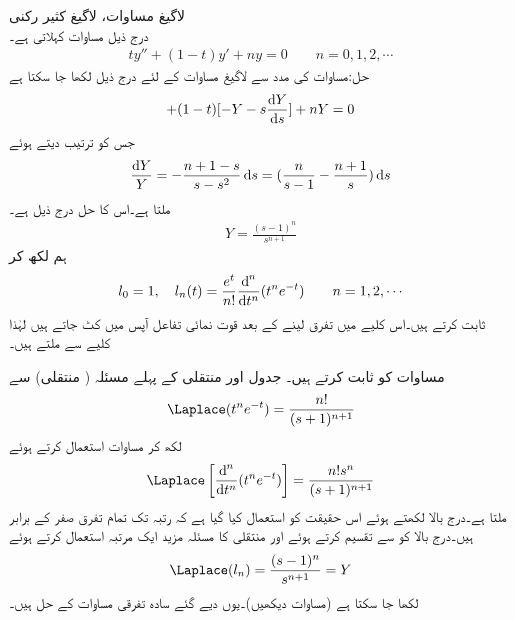 \quad لاگیغ مساوات، لاگیغ کثیر رکنی\\
درج ذیل  مساوات کہلاتی ہے۔ 
\begin{align}\label{مساوات_لاپلاس_لاگیغ_کی_مساوات}
ty''+(1-t)y'+ny=0\quad \quad n=0,1,2,\cdots
\end{align}
حل:مساوات  کی مدد سے لاگیغ مساوات کے لئے درج ذیل لکھا جا سکتا ہے
\begin{align*}
[-2sY-s^2\frac{\dif Y}{\dif s}+y(0)]+(1-t)[-Y-s\frac{\dif Y}{\dif s}]+nY=0
\end{align*}
جس کو ترتیب دیتے ہوئے
\begin{align*}
\frac{\dif Y}{Y}=-\frac{n+1-s}{s-s^2}\dif s=(\frac{n}{s-1}-\frac{n+1}{s})\dif s
\end{align*}
ملتا ہے۔اس کا حل درج ذیل ہے۔
\begin{align}
Y=\frac{(s-1)^n}{s^{n+1}}
\end{align}
ہم  لکھ کر 
\begin{align}\label{مساوات_لاپلاس_روڈریکیس_کثیر_رکنی}
l_0=1,\quad l_n(t)=\frac{e^t}{n!}\frac{\dif^{\,n}}{\dif t^n}(t^ne^{-t})\quad \quad n=1,2,\cdots
\end{align}
ثابت کرتے ہیں۔اس کلیے میں تفرق لینے کے بعد قوت نمائی تفاعل آپس میں کٹ جاتے ہیں لہٰذا کلیے سے  ملتے ہیں۔ 

مساوات  کو ثابت کرتے ہیں۔ جدول  اور منتقلی کے پہلے مسئلہ ( منتقلی) سے
\begin{align}
\Laplace(t^ne^{-t})=\frac{n!}{(s+1)^{n+1}}
\end{align}
لکھ کر مساوات  استعمال کرتے ہوئے
\begin{align*}
\Laplace\left[\frac{\dif^{\,n}}{\dif t^n} (t^ne^{-t})\right]=\frac{n!s^n}{(s+1)^{n+1}}
\end{align*}
ملتا ہے۔درج بالا لکھتے ہوئے اس حقیقت کو استعمال کیا گیا ہے کہ رتبہ  تک تمام تفرق صفر کے برابر ہیں۔درج بالا کو  سے تقسیم کرتے ہوئے اور منتقلی کا مسئلہ مزید ایک مرتبہ استعمال کرتے ہوئے
\begin{align*}
\Laplace(l_n)=\frac{(s-1)^n}{s^{n+1}}=Y
\end{align*}
لکھا جا سکتا ہے (مساوات  دیکھیں)۔یوں  دیے گئے سادہ تفرقی مساوات کے حل ہیں۔

